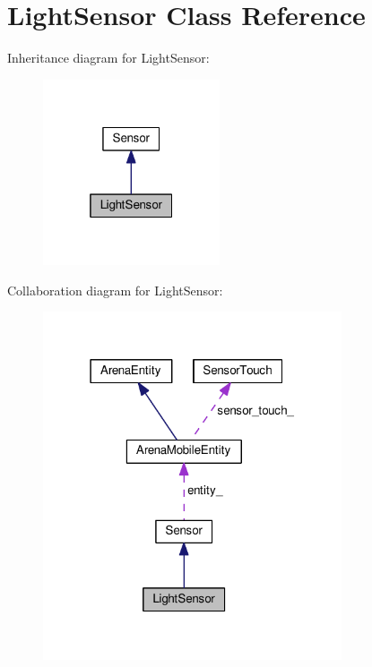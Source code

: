 \hypertarget{classLightSensor}{}\section{Light\+Sensor Class Reference}
\label{classLightSensor}


Inheritance diagram for Light\+Sensor\+:\nopagebreak
\begin{figure}[H]
\begin{center}
\leavevmode
\includegraphics[width=148pt]{classLightSensor__inherit__graph}
\end{center}
\end{figure}


Collaboration diagram for Light\+Sensor\+:\nopagebreak
\begin{figure}[H]
\begin{center}
\leavevmode
\includegraphics[width=250pt]{classLightSensor__coll__graph}
\end{center}
\end{figure}
